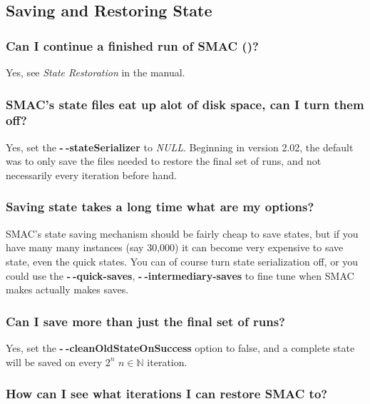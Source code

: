 \documentclass[11pt,letterpaper,oneside]{article}
\begin{document}
\subsection{Saving and Restoring State}

\subsubsection{Can I continue a finished run of SMAC ()?}

	Yes, see \emph{State Restoration} in the manual.

\subsubsection{SMAC's state files eat up alot of disk space, can I turn them off?}

	Yes, set the \textbf{-$~\!$-stateSerializer} to \emph{NULL}. Beginning in version 2.02, the default was to only save the files needed to restore the final set of runs, and not necessarily every iteration before hand.
	
\subsubsection{Saving state takes a long time what are my options?}

	SMAC's state saving mechanism should be fairly cheap to save states, but if you have many many instances (say 30,000) it can become very expensive to save state, even the quick states. You can of course turn state serialization off, or you could use the \textbf{-$~\!$-quick-saves}, \textbf{-$~\!$-intermediary-saves} to fine tune when SMAC makes actually makes saves.
          			
	
	
\subsubsection{Can I save more than just the final set of runs?}

	Yes, set the \textbf{-$~\!$-cleanOldStateOnSuccess} option to false, and a complete state will be saved on every $2^n$  $n\in\mathbb{N}$ iteration.

\subsubsection{How can I see what iterations I can restore SMAC to?}
\end{document}
